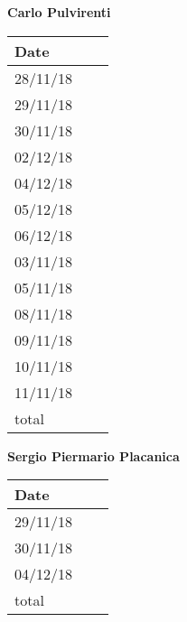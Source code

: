\documentclass[../main.tex]{subfiles}
\begin{document}
\begin{center}
	{\bf Carlo Pulvirenti}
	\vspace{2mm}

		\begin{tabular}{p{1.3cm}|p{1.8cm}|p{6.7cm}}
			\hline
			\bf Date & \bf \makebox[1.8cm][c]{Hours} & \bf \makebox[6.7cm][c]{Description} \\
			\hline
			28/11/18 & \makebox[1.8cm][c]{1h} & \makebox[6.7cm][c]{Architectural Design}\\
			29/11/18 & \makebox[1.8cm][c]{3h} & \makebox[6.7cm][c]{Runtime View}\\
			30/11/18 & \makebox[1.8cm][c]{2h} & \makebox[6.7cm][c]{Runtime View}\\
			02/12/18 & \makebox[1.8cm][c]{4h} & \makebox[6.7cm][c]{Runtime View}\\
			04/12/18 & \makebox[1.8cm][c]{2h} & \makebox[6.7cm][c]{Reviewing}\\
			05/12/18 & \makebox[1.8cm][c]{3h} & \makebox[6.7cm][c]{Deployment View}\\
			06/12/18 & \makebox[1.8cm][c]{4h} & \makebox[6.7cm][c]{Component Interfaces}\\
			03/11/18 & \makebox[1.8cm][c]{1h} & \makebox[6.7cm][c]{UML Class \& State Machine Diagrams}\\
			05/11/18 & \makebox[1.8cm][c]{4h} & \makebox[6.7cm][c]{Scenarios, Sequence Diagrams}\\
			08/11/18 & \makebox[1.8cm][c]{2h} & \makebox[6.7cm][c]{Sequence Diagramm, Alloy}\\
			09/11/18 & \makebox[1.8cm][c]{2h} & \makebox[6.7cm][c]{Sequence Diagram, Revisioning}\\
			10/11/18 & \makebox[1.8cm][c]{2h} & \makebox[6.7cm][c]{Revisioning}\\
			11/11/18 & \makebox[1.8cm][c]{4h} & \makebox[6.7cm][c]{Revisioning}\\
			total    & \makebox[1.8cm][c]{42h}
		\end{tabular}
\end{center}

\vspace{1cm}

\newpage

\begin{center}
	{\bf Sergio Piermario Placanica}
	\vspace{2mm}

		\begin{tabular}{p{1.3cm}|p{1.8cm}|p{6.7cm}}
			\hline
			\bf Date & \bf \makebox[1.8cm][c]{Hours} & \bf \makebox[6.7cm][c]{Description} \\
			\hline
			29/11/18 & \makebox[1.8cm][c]{2h} & \makebox[6.7cm][c]{Architechtural Design}\\
			30/11/18 & \makebox[1.8cm][c]{1h} & \makebox[6.7cm][c]{Architectural Design}\\
			04/12/18 & \makebox[1.8cm][c]{2h} & \makebox[6.7cm][c]{Reviewing}\\


			total    & \makebox[1.8cm][c]{5h}
		\end{tabular}
	\end{center}
\end{document}
